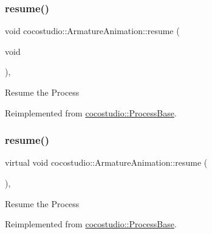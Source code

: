 \subsubsection{\texorpdfstring{resume()}{resume()}\hspace{0.1cm}{\footnotesize\ttfamily [1/2]}}
{\footnotesize\ttfamily void cocostudio\+::\+Armature\+Animation\+::resume (\begin{DoxyParamCaption}\item[{void}]{ }\end{DoxyParamCaption})\hspace{0.3cm}{\ttfamily [override]}, {\ttfamily [virtual]}}

Resume the Process 

Reimplemented from \hyperlink{classcocostudio_1_1ProcessBase_a4e1927ae31e52d92b976b41229160f70}{cocostudio\+::\+Process\+Base}.

\mbox{\label{classcocostudio_1_1ArmatureAnimation_a79accb8d66ca70de4c5587b0018070b1}} 
\subsubsection{\texorpdfstring{resume()}{resume()}\hspace{0.1cm}{\footnotesize\ttfamily [2/2]}}
{\footnotesize\ttfamily virtual void cocostudio\+::\+Armature\+Animation\+::resume (\begin{DoxyParamCaption}{ }\end{DoxyParamCaption})\hspace{0.3cm}{\ttfamily [override]}, {\ttfamily [virtual]}}

Resume the Process 

Reimplemented from \hyperlink{classcocostudio_1_1ProcessBase_a4e1927ae31e52d92b976b41229160f70}{cocostudio\+::\+Process\+Base}.

\mbox{\label{classcocostudio_1_1ArmatureAnimation_aaa34e04e1033bd408fb48c27e22e1e61}} 
